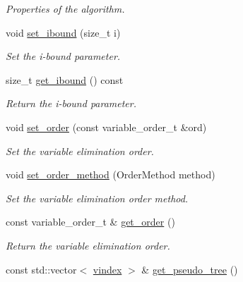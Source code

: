 \begin{DoxyCompactItemize}
\begin{DoxyCompactList}\small\item\em Properties of the algorithm. \end{DoxyCompactList}\item 
void \hyperlink{classmerlin_1_1jglp_a81a1ba0a30b0a415f95438b4e3b4979b}{set\+\_\+ibound} (size\+\_\+t i)
\begin{DoxyCompactList}\small\item\em Set the i-\/bound parameter. \end{DoxyCompactList}\item 
\hypertarget{classmerlin_1_1jglp_ab9b49439616ac5cc826dc3614d522ba8}{}size\+\_\+t \hyperlink{classmerlin_1_1jglp_ab9b49439616ac5cc826dc3614d522ba8}{get\+\_\+ibound} () const \label{classmerlin_1_1jglp_ab9b49439616ac5cc826dc3614d522ba8}

\begin{DoxyCompactList}\small\item\em Return the i-\/bound parameter. \end{DoxyCompactList}\item 
void \hyperlink{classmerlin_1_1jglp_ada0022232bd0e11e043d997341ebeb8c}{set\+\_\+order} (const variable\+\_\+order\+\_\+t \&ord)
\begin{DoxyCompactList}\small\item\em Set the variable elimination order. \end{DoxyCompactList}\item 
void \hyperlink{classmerlin_1_1jglp_a0cc988afd7be26d8e3abe557e87ca445}{set\+\_\+order\+\_\+method} (Order\+Method method)
\begin{DoxyCompactList}\small\item\em Set the variable elimination order method. \end{DoxyCompactList}\item 
\hypertarget{classmerlin_1_1jglp_a03f29b87c291dc6c759c0ddef24569b8}{}const variable\+\_\+order\+\_\+t \& \hyperlink{classmerlin_1_1jglp_a03f29b87c291dc6c759c0ddef24569b8}{get\+\_\+order} ()\label{classmerlin_1_1jglp_a03f29b87c291dc6c759c0ddef24569b8}

\begin{DoxyCompactList}\small\item\em Return the variable elimination order. \end{DoxyCompactList}\item 
\hypertarget{classmerlin_1_1jglp_a3b2d6adcead0b1ec15ef9d0fbf412d1b}{}const std\+::vector$<$ \hyperlink{classmerlin_1_1jglp_a85f09fc4dc206dd719f08d08b1db9591}{vindex} $>$ \& \hyperlink{classmerlin_1_1jglp_a3b2d6adcead0b1ec15ef9d0fbf412d1b}{get\+\_\+pseudo\+\_\+tree} ()\label{classmerlin_1_1jglp_a3b2d6adcead0b1ec15ef9d0fbf412d1b}


\end{DoxyCompactItemize}
